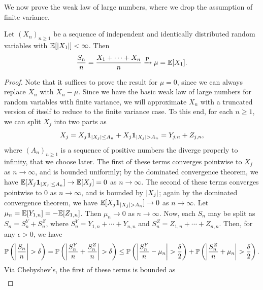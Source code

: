 We now prove the weak law of large numbers, where we drop the assumption of finite variance.
\begin{theorem}
    Let $(X_{n})_{n \geq 1}$ be a sequence of independent and identically distributed random variables with $\mathbb{E}[\left| X_{1} \right|] < \infty$. Then
    \begin{align}
        \frac{S_{n}}{n} =\frac{X_{1} + \cdots + X_{n}}{n} \xrightarrow{\operatorname{P}} \mu = \mathbb{E}[X_{1}].
    \end{align}
\end{theorem}
\begin{proof}
    Note that it suffices to prove the result for $\mu = 0$, since we can always replace $X_{n}$ with $X_{n}-\mu$. Since we have the basic weak law of large numbers for random variables with finite variance, we will approximate $X_{n}$ with a truncated version of itself to reduce to the finite variance case. To this end, for each $n \geq 1$, we can split $X_{j}$ into two parts as
    \begin{align}
        X_{j} = X_{j} \textbf{1}_{\left| X_{j} \right| \leq A_{n}} + X_{j} \textbf{1}_{\left| X_{j} \right| > A_{n}} = Y_{j,n} + Z_{j,n},
    \end{align}
    where $(A_{n})_{n \geq 1}$ is a sequence of positive numbers the diverge properly to infinity, that we choose later. The first of these terms converges pointwise to $X_{j}$ as $n \to \infty$, and is bounded uniformly; by the dominated convergence theorem, we have $\mathbb{E}[X_{j} \textbf{1}_{\left| X_{j} \right| \leq A_{n}}] \to \mathbb{E}[X_{j}] = 0$ as $n \to \infty$. The second of these terms converges pointwise to $0$ as $n \to \infty$, and is bounded by $\left| X_{j} \right|$; again by the dominated convergence theorem, we have $\mathbb{E}[X_{j} \textbf{1}_{\left| X_{j} \right| > A_{n}}] \to 0$ as $n \to \infty$. Let $\mu_{n} = \mathbb{E}[Y_{1,n}] = -\mathbb{E}[Z_{1,n}]$. Then $\mu_{n} \to 0$ as $n \to \infty$. Now, each $S_{n}$ may be split as $S_{n} = S_{n}^{Y} + S_{n}^{Z}$, where $S_{n}^{Y} = Y_{1,n} + \cdots + Y_{n,n}$ and $S_{n}^{Z} = Z_{1,n} + \cdots + Z_{n,n}$. Then, for any $\epsilon > 0$, we have
    \begin{align}
        \mathbb{P}\left(\left| \frac{S_{n}}{n} \right| > \delta \right) = \mathbb{P}\left(\left| \frac{S_{n}^{Y}}{n} + \frac{S_{n}^{Z}}{n} \right| > \delta \right) \leq \mathbb{P}\left(\left| \frac{S_{n}^{Y}}{n} - \mu_{n} \right| > \frac{\delta}{2} \right) + \mathbb{P}\left(\left| \frac{S_{n}^{Z}}{n} + \mu_{n} \right| > \frac{\delta}{2} \right).
    \end{align}
    Via Chebyshev's, the first of these terms is bounded as
    \begin{align}

\end{align}
\end{proof}

